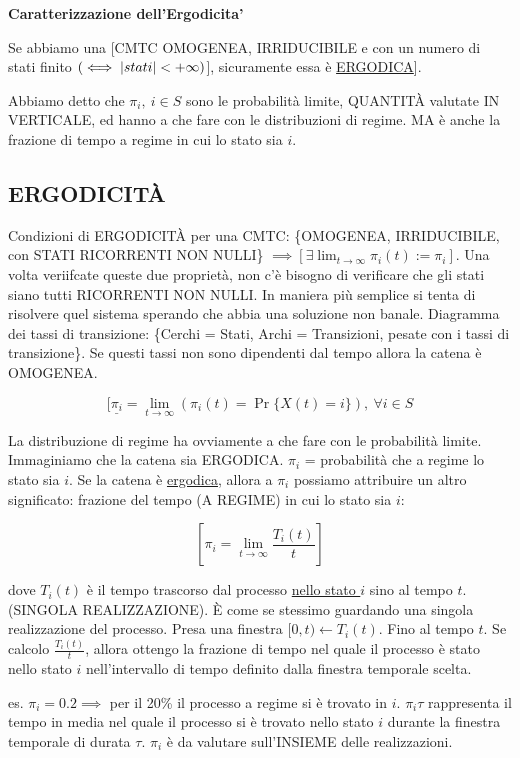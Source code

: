 \begin{corl}{\textbf{Caratterizzazione dell'Ergodicita'}}

Se abbiamo una [CMTC OMOGENEA, IRRIDUCIBILE e con un numero di stati finito $(\iff\left\vert{stati}\right\vert<+\infty)$], sicuramente essa è \underline{ERGODICA}].

\end{corl}

Abbiamo detto che $\pi_i,\ i\in S$ sono le probabilità limite, QUANTIT\`A valutate IN VERTICALE, ed hanno a che fare con le distribuzioni di regime. MA è anche la frazione di tempo a regime in cui lo stato sia $i$.

\subsection{ERGODICIT\`A}

Condizioni di ERGODICIT\`A per una CMTC: \{OMOGENEA, IRRIDUCIBILE, con STATI RICORRENTI NON NULLI\} $\implies [\exists \lim_{t\to\infty}{\pi_i(t)} := \pi_i]$. Una volta veriifcate queste due proprietà, non c'è bisogno di verificare che gli stati siano tutti RICORRENTI NON NULLI. In maniera più semplice si tenta di risolvere quel sistema sperando che abbia una soluzione non banale. Diagramma dei tassi di transizione: \{Cerchi = Stati, Archi = Transizioni, pesate con i tassi di transizione\}. Se questi tassi non sono dipendenti dal tempo allora la catena è OMOGENEA. 

\[
	[\underline{\pi_i} = \lim_{t\to\infty}{(\pi_i(t) = \Pr\{X(t)=i\})},\ \forall i\in S
\]

La distribuzione di regime ha ovviamente a che fare con le probabilità limite. Immaginiamo che la catena sia ERGODICA. $\pi_i$ = probabilità che a regime lo stato sia $i$. Se la catena è \underline{ergodica}, allora a $\pi_i$ possiamo attribuire un altro significato: frazione del tempo (A REGIME) in cui lo stato sia $i$:

\[
	[\pi_i = \lim_{t\to\infty}{\frac{T_i(t)}{t}}]
\]

dove $T_i(t)$ è il tempo trascorso dal processo \underline{nello stato $i$} sino al tempo $t$. (SINGOLA REALIZZAZIONE). \`E come se stessimo guardando una singola realizzazione del processo. Presa una finestra $[0,t) \leftarrow T_i(t)$. Fino al tempo $t$. Se calcolo $\frac{T_i(t)}{t}$, allora ottengo la frazione di tempo nel quale il processo è stato nello stato $i$ nell'intervallo di tempo definito dalla finestra temporale scelta.

es. $\pi_i = 0.2 \implies$ per il 20\% il processo a regime si è trovato in $i$. $\pi_i\tau$ rappresenta il tempo in media nel quale il processo si è trovato nello stato $i$ durante la finestra temporale di durata $\tau$. $\pi_i$ è da valutare sull'INSIEME delle realizzazioni.

